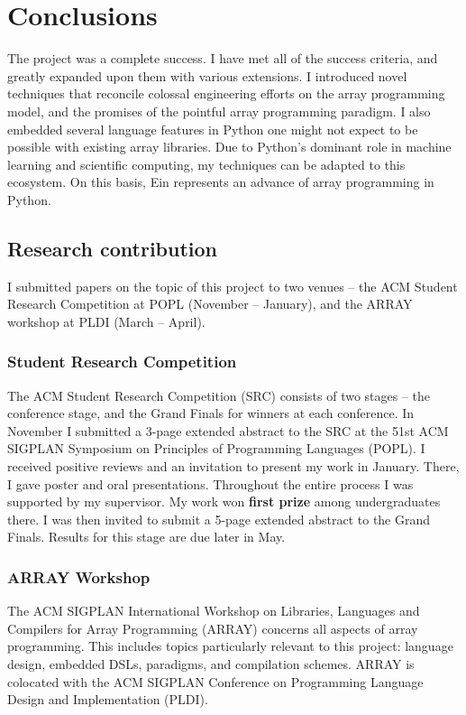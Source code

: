 \chapter{Conclusions}

The project was a complete success. 
I have met all of the success criteria, and greatly expanded upon them with various extensions. 
I introduced novel techniques that reconcile colossal engineering efforts on the array programming model, and the promises of the pointful array programming paradigm. 
I also embedded several language features in Python one might not expect to be possible with existing array libraries. 
Due to Python's dominant role in machine learning and scientific computing, my techniques can be adapted to this ecosystem. 
On this basis, Ein represents an advance of array programming in Python.


\section{Research contribution}
\label{research-contribution}

I submitted papers on the topic of this project to two venues -- the ACM Student Research Competition at POPL (November -- January), and the ARRAY workshop at PLDI (March -- April).

\subsection{Student Research Competition}

The ACM Student Research Competition (SRC) consists of two stages -- the conference stage, and the Grand Finals for winners at each conference. In November I submitted a 3-page extended abstract to the SRC at the 51st ACM SIGPLAN Symposium on Principles of Programming Languages (POPL).
I received positive reviews and an invitation to present my work in January. 
There, I gave poster and oral presentations.
Throughout the entire process I was supported by my supervisor.
My work won \textbf{first prize} among undergraduates there. I was then invited to submit a 5-page extended abstract to the Grand Finals. Results for this stage are due later in May.

\subsection{ARRAY Workshop}

The ACM SIGPLAN International Workshop on Libraries, Languages and Compilers for Array Programming (ARRAY) concerns all aspects of array programming. 
This includes topics particularly relevant to this project: language design, embedded DSLs, paradigms, and compilation schemes.
ARRAY is colocated with the ACM SIGPLAN Conference on Programming Language Design and Implementation (PLDI).

